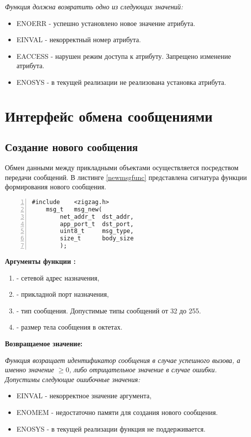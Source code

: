 {\itshape
Функция  должна возвратить одно из следующих значений:
\begin{itemize}
\item ENOERR - успешно установлено новое значение атрибута.
\item EINVAL - некорректный номер атрибута.
\item EACCESS - нарушен режим доступа к атрибуту. Запрещено изменение атрибута.
\item ENOSYS - в текущей реализации не реализована установка атрибута.
\end{itemize}
}

\section{Интерфейс обмена сообщениями}

\subsection{Создание нового сообщения}

Обмен данными между прикладными объектами осуществляется посредством передачи сообщений.
В листинге \ref{newmsgfunc} представлена сигнатура функции формирования нового сообщения.

\begin{lstlisting}[caption=Функция \myfunc{msg\_new()} - создание сообщения., label=newmsgfunc, numbers=left, frame=leftline]
    #include    <zigzag.h>
    msg_t   msg_new(
        net_addr_t  dst_addr,
        app_port_t  dst_port,
        uint8_t     msg_type,
        size_t      body_size
        );
\end{lstlisting}

{\bfseries Аргументы функции :}

{\itshape
\begin{enumerate}
\item {} - сетевой адрес назначения,
\item {} - прикладной порт назначения,
\item {} - тип сообщения. Допустимые типы сообщений от 32 до 255.
\item {} - размер тела сообщения в октетах.
\end{enumerate}
}

{\bfseries Возвращаемое значение:}

{\itshape
Функция возращает идентификатор сообщения в случае успешного вызова, а именно значение $\geq 0$, либо
отрицательное значение в случае ошибки. Допустимы следующие ошибочные значения:
\begin{itemize}
\item EINVAL - некорректное значение аргумента,
\item ENOMEM - недостаточно памяти для создания нового сообщения.
\item ENOSYS - в текущей реализации функция не поддерживается.
\end{itemize}
}

